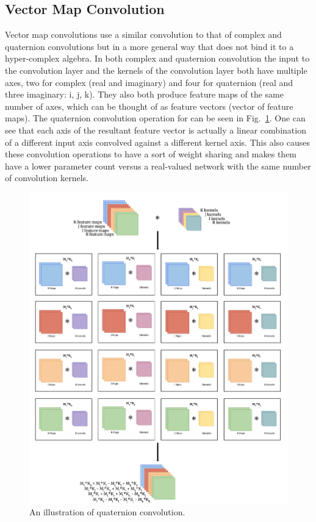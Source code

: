 \documentclass[14pt,a4paper]{article}
\begin{document}
\subsection{Vector Map Convolution}
Vector map convolutions use a similar convolution to that of complex \cite{trabelsi+al-2018-complexconv} and quaternion \cite{Gaudet2018} convolutions but in a more general way that does not bind it to a hyper-complex algebra.
In both complex and quaternion convolution the input to the convolution layer and the kernels of the convolution layer both have multiple axes, two for complex (real and imaginary) and four for quaternion (real and three imaginary: i, j, k).
They also both produce feature maps of the same number of axes, which can be thought of as feature vectors (vector of feature maps).
The quaternion convolution operation for can be seen in Fig.~\ref{f:quatconv}.
One can see that each axis of the resultant feature vector is actually a linear combination of a different input axis convolved against a different kernel axis.
This also causes these convolution operations to have a sort of weight sharing and makes them have a lower parameter count versus a real-valued network with the same number of convolution kernels.

\begin{figure}
	\centering
		\includegraphics[width=1.0\columnwidth]{figures/quatconv.png}
		\caption{An illustration of quaternion convolution.}
	\label{f:quatconv}
\end{figure}
\end{document}
